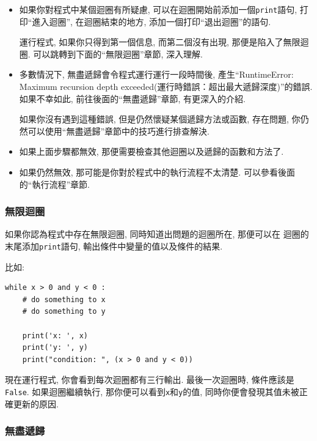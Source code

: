 \documentclass[10pt]{book}
\begin{document}
\begin{itemize}

\item 如果你對程式中某個迴圈有所疑慮, 可以在迴圈開始前添加一個{\tt print}語句, 
打印``進入迴圈'', 在迴圈結束的地方, 添加一個打印``退出迴圈''的語句. 

運行程式, 如果你只得到第一個信息, 而第二個沒有出現, 
那便是陷入了無限迴圈. 可以跳轉到下面的``無限迴圈''章節, 深入理解. 

\item 多數情況下, 無盡遞歸會令程式運行運行一段時間後, 產生``RuntimeError: Maximum
recursion depth exceeded(運行時錯誤：超出最大遞歸深度)''的錯誤. 
如果不幸如此, 前往後面的``無盡遞歸''章節, 有更深入的介紹. 

如果你沒有遇到這種錯誤, 但是仍然懷疑某個遞歸方法或函數, 存在問題, 
你仍然可以使用``無盡遞歸''章節中的技巧進行排查解決. 

\item 如果上面步驟都無效, 那便需要檢查其他迴圈以及遞歸的函數和方法了. 

\item 如果仍然無效, 那可能是你對於程式中的執行流程不太清楚. 
可以參看後面的``執行流程''章節. 
\end{itemize}


\subsubsection{無限迴圈}

如果你認為程式中存在無限迴圈, 同時知道出問題的迴圈所在, 那便可以在
迴圈的末尾添加{\tt print}語句, 輸出條件中變量的值以及條件的結果. 

比如:

\begin{verbatim}
while x > 0 and y < 0 :
    # do something to x
    # do something to y

    print('x: ', x)
    print('y: ', y)
    print("condition: ", (x > 0 and y < 0))
\end{verbatim}
%
現在運行程式, 你會看到每次迴圈都有三行輸出. 
最後一次迴圈時, 條件應該是{\tt False}.
如果迴圈繼續執行, 那你便可以看到{\tt x}和{\tt y}的值, 
同時你便會發現其值未被正確更新的原因.


\subsubsection{無盡遞歸}
\end{document}
